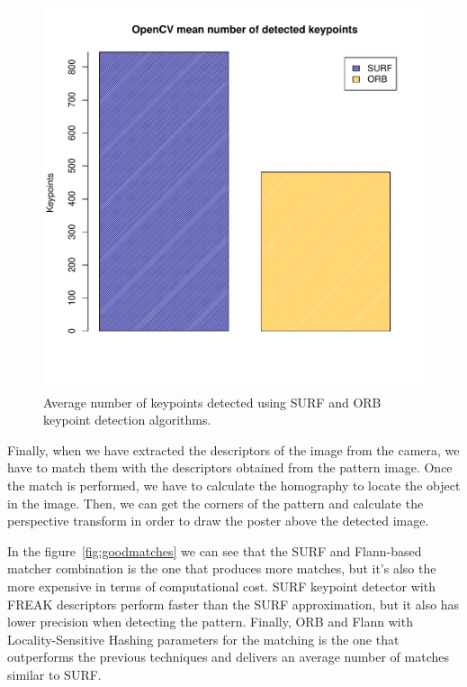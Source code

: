\begin{figure}
\centering
\includegraphics[scale=0.75]{performance/keypoints-number.pdf}
\caption{\label{fig:numberkp} Average number of keypoints detected using SURF and
  ORB keypoint detection algorithms.}
\end{figure} 

Finally, when we have extracted the descriptors of the image from the camera, we
have to match them with the descriptors obtained from the pattern image. Once the
match is performed, we have to calculate the homography to locate the object in the
image. Then, we can get the corners of the pattern and calculate the perspective
transform in order to draw the poster above the detected image. 

In the figure~\ref{fig:goodmatches} we can see that the SURF and Flann-based matcher
combination is the one that produces more matches, but it's also the more expensive
in terms of computational cost. SURF keypoint detector with FREAK descriptors
perform faster than the SURF approximation, but it also has lower precision when
detecting the pattern. Finally, ORB and Flann with Locality-Sensitive Hashing
parameters for the matching is the one that outperforms the previous techniques and
delivers an average number of matches similar to SURF.

